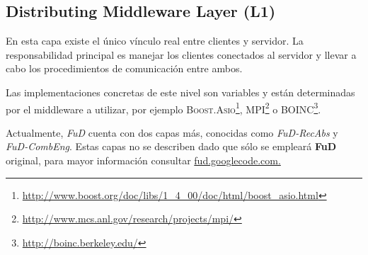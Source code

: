 \subsection{Distributing Middleware Layer (L1)} %
\par En esta capa existe el único vínculo real entre clientes y servidor. La responsabilidad principal es manejar los clientes conectados al servidor y llevar a cabo los procedimientos de comunicación entre ambos.

\par Las implementaciones concretas de este nivel son variables y están determinadas por el middleware a utilizar, por ejemplo \textsc{Boost.Asio}\footnote{\url{http://www.boost.org/doc/libs/1\_4\_00/doc/html/boost\_asio.html}}, \textsc{MPI}\footnote{\url{http://www.mcs.anl.gov/research/projects/mpi/}} o \textsc{BOINC}\footnote{\url{http://boinc.berkeley.edu/}}. 
		
\par Actualmente, \emph{FuD} cuenta con dos capas más, conocidas como \emph{FuD-RecAbs} y \emph{FuD-CombEng}. Estas capas no se describen dado que sólo se empleará \textbf{FuD} original, para mayor información consultar \url{fud.googlecode.com.}